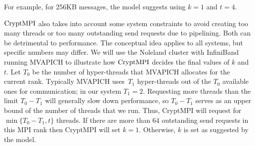 For example, for 256KB messages, the model suggests using $k=1$ and $t=4$. 

$\textrm{CryptMPI}$ also takes into account some system constraints to
avoid creating too many threads or too many outstanding
send requests due to pipelining. Both can be detrimental to performance. 
The conceptual idea applies to all systems, but specific numbers may differ. 
We will use the Noleland cluster with InfiniBand running MVAPICH
to illustrate how $\textrm{CryptMPI}$ decides the final values of $k$ and $t$. 
Let $T_0$ be the number of hyper-threads that MVAPICH allocates
for the current rank. 
Typically MVAPICH uses~$T_1$ hyper-threads out of the $T_0$ available
ones for communication; in our system $T_1 = 2$. 
Requesting more threads than the limit $T_0 - T_1$ will generally slow down
performance, so $T_0 - T_1$ serves as an upper bound of the number of threads
that we run. Thus, CryptMPI will request for $\min\{T_0-T_1, t\}$ threads. 
If there are more than 64 outstanding send requests in this MPI rank
then CryptMPI will set $k = 1$. 
Otherwise, $k$ is set as suggested by the model. 

%


